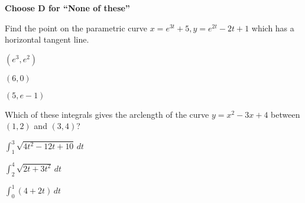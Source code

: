 \documentclass[12pt]{exam}
\newcommand{\<}{(}
\renewcommand{\>}{)}
\begin{document}
\begin{center}
\end{center}
\vspace{0.1in}

\vspace{12pt}

\textbf{Choose D for ``None of these''}

\begin{questions}\setcounter{question}{18}

\question
Find the point on the parametric curve
    \(x=e^{3t}+5,y=e^{2t}-2t+1\)
    which has a horizontal tangent line.
\begin{choices}
\item \((e^3,e^2)\)
\item \((6,0)\)
\item \((5,e-1)\)
\end{choices}

\question
Which of these integrals gives the arclength of the curve
\(y=x^2-3x+4\) between \((1,2)\) and \((3,4)\)?
\begin{choices}
\item \(\int_1^3\sqrt{4t^2-12t+10}\,dt\)
\item \(\int_2^4\sqrt{2t+3t^2}\,dt\)
\item \(\int_0^1(4+2t)\,dt\)
\end{choices}




\end{questions}
\end{document}
